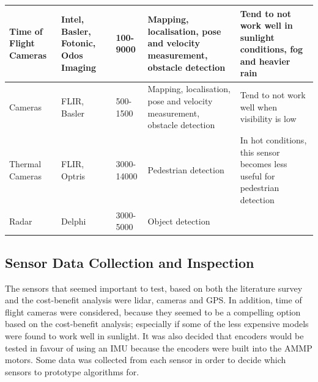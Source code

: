 \documentclass[preprint,authoryear,12pt]{elsarticle}
\begin{document}
\begin{table}[h!]
\begin{tabular}{ | m{1.4cm} | m{2.9cm}| m{1.4cm} | m{2.9cm} | m{2.9cm} }
    \hline
    \scriptsize Time of Flight Cameras & \scriptsize Intel, Basler, Fotonic, Odos Imaging & \scriptsize 100-9000 & \scriptsize Mapping, localisation, pose and velocity measurement, obstacle detection & \scriptsize Tend to not work well in sunlight conditions, fog and heavier rain \\
    \hline
    \scriptsize Cameras & \scriptsize FLIR, Basler & \scriptsize 500-1500 & \scriptsize Mapping, localisation, pose and velocity measurement, obstacle detection & \scriptsize Tend to not work well when visibility is low \\
    \hline
    \scriptsize Thermal Cameras & \scriptsize FLIR, Optris & \scriptsize 3000-14000 & \scriptsize Pedestrian detection & \scriptsize In hot conditions, this sensor becomes less useful for pedestrian detection \\
    \hline
    \scriptsize Radar & \scriptsize Delphi & \scriptsize 3000-5000 & \scriptsize Object detection & \scriptsize \\
    \hline
    \end{tabular}
    \end{table}

\subsection{Sensor Data Collection and Inspection}
    The sensors that seemed important to test, based on both the literature survey and the cost-benefit analysis were lidar, cameras and GPS. In addition, time of flight cameras were considered, because they seemed to be a compelling option based on the cost-benefit analysis; especially if some of the less expensive models were found to work well in sunlight. It was also decided that encoders would be tested in favour of using an IMU because the encoders were built into the AMMP motors. Some data was collected from each sensor in order to decide which sensors to prototype algorithms for.
\end{document}
